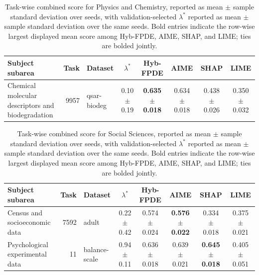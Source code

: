 \begin{table}[!tbp]
    \caption{Task-wise combined score for Physics and Chemistry, reported as mean $\pm$ sample standard deviation over seeds, with validation-selected $\lambda^*$ reported as mean $\pm$ sample standard deviation over the same seeds. Bold entries indicate the row-wise largest displayed mean score among Hyb-FPDE, AIME, SHAP, and LIME; ties are bolded jointly.}
    \label{tab:taskwise_combined_scores_sd_physics_chemistry}
    \centering
    \scriptsize
    \setlength{\tabcolsep}{3pt}
    \renewcommand{\arraystretch}{1.03}
    \begin{tabular}{lrlccccc}
        \toprule
        Subject subarea & Task & Dataset & $\lambda^*$ & Hyb-FPDE & AIME & SHAP & LIME  \\
        \midrule
        Chemical molecular descriptors and biodegradation & 9957 & qsar-biodeg & 0.10 $\pm$ 0.19 & \textbf{0.635 $\pm$ 0.018} & 0.634 $\pm$ 0.018 & 0.438 $\pm$ 0.026 & 0.350 $\pm$ 0.032 \\
        \bottomrule
    \end{tabular}%
\end{table}

\begin{table}[!tbp]
    \caption{Task-wise combined score for Social Sciences, reported as mean $\pm$ sample standard deviation over seeds, with validation-selected $\lambda^*$ reported as mean $\pm$ sample standard deviation over the same seeds. Bold entries indicate the row-wise largest displayed mean score among Hyb-FPDE, AIME, SHAP, and LIME; ties are bolded jointly.}
    \label{tab:taskwise_combined_scores_sd_social_sciences}
    \centering
    \scriptsize
    \setlength{\tabcolsep}{3pt}
    \renewcommand{\arraystretch}{1.03}
    \begin{tabular}{lrlccccc}
        \toprule
        Subject subarea & Task & Dataset & $\lambda^*$ & Hyb-FPDE & AIME & SHAP & LIME  \\
        \midrule
        Census and socioeconomic data & 7592 & adult & 0.22 $\pm$ 0.42 & 0.574 $\pm$ 0.024 & \textbf{0.576 $\pm$ 0.022} & 0.334 $\pm$ 0.018 & 0.375 $\pm$ 0.021 \\
        Psychological experimental data & 11 & balance-scale & 0.94 $\pm$ 0.11 & 0.636 $\pm$ 0.018 & 0.639 $\pm$ 0.021 & \textbf{0.645 $\pm$ 0.018} & 0.405 $\pm$ 0.051 \\
        \bottomrule
    \end{tabular}%
\end{table}

